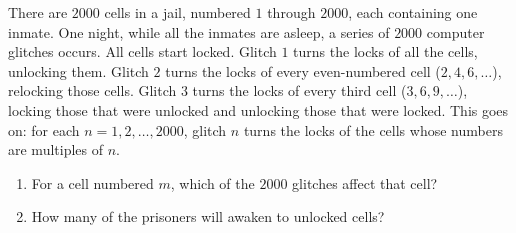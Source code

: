 There are $2000$ cells in a jail, numbered $1$ through $2000$, each containing one inmate. One night, while all the inmates are asleep, a series of $2000$ computer glitches occurs. All cells start locked. Glitch $1$ turns the locks of all the cells, unlocking them. Glitch $2$ turns the locks of every even-numbered cell ($2,4,6,\dots$), relocking those cells. Glitch $3$ turns the locks of every third cell ($3,6,9,\dots$), locking those that were unlocked and unlocking those that were locked. This goes on: for each $n=1,2,\dots,2000$, glitch $n$ turns the locks of the cells whose numbers are multiples of $n$.
\begin{enumerate}
\item[(a)] For a cell numbered $m$, which of the $2000$ glitches affect that cell?
\item[(b)] How many of the prisoners will awaken to unlocked cells?
\end{enumerate}
